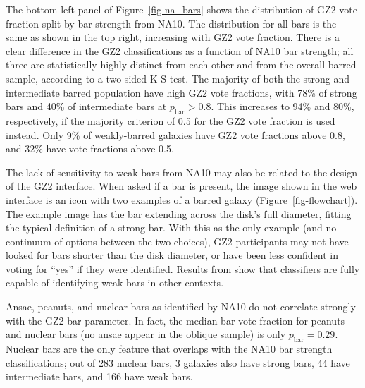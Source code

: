\documentclass[useAMS,usenatbib]{mn2e}
\begin{document}


The bottom left panel of Figure~\ref{fig-na_bars} shows the distribution of GZ2 vote fraction split by bar strength from NA10. The distribution for all bars is the same as shown in the top right, increasing with GZ2 vote fraction. There is a clear difference in the GZ2 classifications as a function of NA10 bar strength; all three are statistically highly distinct from each other and from the overall barred sample, according to a two-sided K-S test. The majority of both the strong and intermediate barred population have high GZ2 vote fractions, with 78\% of strong bars and 40\% of intermediate bars at $p_\mathrm{bar}>0.8$. This increases to 94\% and 80\%, respectively, if the majority criterion of 0.5 \citep{mas11c} for the GZ2 vote fraction is used instead. Only 9\% of weakly-barred galaxies have GZ2 vote fractions above 0.8, and 32\% have vote fractions above 0.5. 

The lack of sensitivity to weak bars from NA10 may also be related to the design of the GZ2 interface. When asked if a bar is present, the image shown in the web interface is an icon with two examples of a barred galaxy (Figure~\ref{fig-flowchart}). The example image has the bar extending across the disk's full diameter, fitting the typical definition of a strong bar. With this as the only example (and no continuum of options between the two choices), GZ2 participants may not have looked for bars shorter than the disk diameter, or have been less confident in voting for ``yes'' if they were identified. Results from \citet{hoy11} show that classifiers are fully capable of identifying weak bars in other contexts.

Ansae, peanuts, and nuclear bars as identified by NA10 do not correlate strongly with the GZ2 bar parameter. In fact, the median bar vote fraction for peanuts and nuclear bars (no ansae appear in the oblique sample) is only $p_\mathrm{bar}=0.29$. Nuclear bars are the only feature that overlaps with the NA10 bar strength classifications; out of 283 nuclear bars, 3 galaxies also have strong bars, 44 have intermediate bars, and 166 have weak bars.
\end{document}
